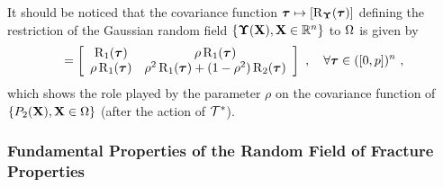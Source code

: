 It should be noticed that the covariance function $\boldsymbol{\tau} \mapsto [\operatorname{R}_{\boldsymbol{\Upsilon}}(\boldsymbol{\tau})]$ defining the restriction of the Gaussian random field $\{\boldsymbol{\Upsilon}(\textbf{X}), \textbf{X} \in \mathbb{R}^n\}$ to $\Omega$ is given by
\begin{align}
  [\cor_{\bs{\Upsilon}}(\bs{\tau})] = \left[\begin{array}{cc}\cor_1(\bs{\tau}) & \rho \cor_1(\bs{\tau}) \\\rho \cor_1(\bs{\tau}) & \rho^2 \cor_1(\bs{\tau}) + (1-\rho^2) \cor_2(\bs{\tau}) \end{array}\right]~, \quad \forall \bs{\tau} \in ([0,p])^n~,
\end{align}
which shows the role played by the parameter $\rho$ on the covariance function of $\{P_2(\textbf{X}), \textbf{X} \in \Omega\}$ (after the action of $\mathcal{T}^*$).

\subsubsection{Fundamental Properties of the Random Field of Fracture Properties}

